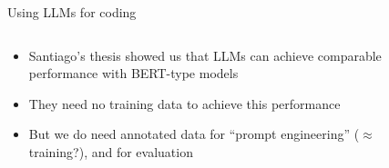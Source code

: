 \documentclass[9pt,aspectratio=169]{beamer}
\begin{document}
\begin{frame}{Using LLMs for coding}
		\begin{columns}
		\begin{column}{0.4\linewidth}
			\begin{itemize}
				\item<1-> Santiago's thesis showed us that LLMs can achieve comparable performance with BERT-type models
				\item<2->They need no training data to achieve this performance
				\item<3->But we do need annotated data for ``prompt engineering'' ($\approx$ training?), and for evaluation
			\end{itemize}
		\end{column}
		\begin{column}{0.6\linewidth}
			\begin{figure}
			\end{figure}
		\end{column}
	\end{columns}
	
\end{frame}
\end{document}
